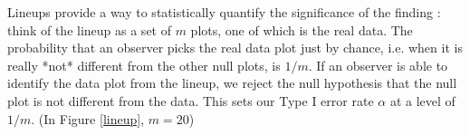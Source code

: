 


Lineups provide a way to statistically quantify the significance of the finding \citet{majumder:2011}: 
think of the lineup as a set of $m$ plots, one of which is the real data. 
The probability that an observer picks the real data plot just by chance, i.e. when it is really *not* different from the other null plots, is $1/m$. 
If an observer is able to identify the data plot from the lineup, we reject the null hypothesis that the null plot is not different from the data.  This sets  our Type I error rate  $\alpha$ at a level of $1/m$. (In Figure \ref{lineup}, $m=20$)

